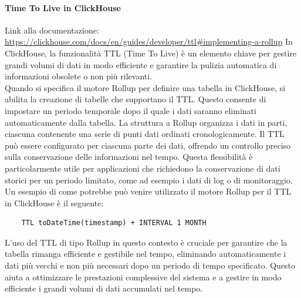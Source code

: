 \paragraph{Time To Live in ClickHouse} \label{sec:RollupTTL}
Link alla documentazione: \href{https://clickhouse.com/docs/en/guides/developer/ttl#implementing-a-rollup}{https://clickhouse.com/docs/en/guides/developer/ttl\#implementing-a-rollup} \newline
In ClickHouse, la funzionalità TTL (Time To Live) è un elemento chiave per gestire grandi volumi di dati in modo efficiente e garantire la pulizia automatica di informazioni obsolete o non più rilevanti. \\
Quando si specifica il motore Rollup per definire una tabella in ClickHouse, si abilita la creazione di tabelle che supportano il TTL. Questo consente di impostare un periodo temporale dopo il quale i dati saranno eliminati automaticamente dalla tabella. La struttura a Rollup organizza i dati in parti, ciascuna contenente una serie di punti dati ordinati cronologicamente. Il TTL può essere configurato per ciascuna parte dei dati, offrendo un controllo preciso sulla conservazione delle informazioni nel tempo. Questa flessibilità è particolarmente utile per applicazioni che richiedono la conservazione di dati storici per un periodo limitato, come ad esempio i dati di log o di monitoraggio. \newline
Un esempio di come potrebbe può venire utilizzato il motore Rollup per il TTL in ClickHouse è il seguente:
\begin{verbatim}
    TTL toDateTime(timestamp) + INTERVAL 1 MONTH
\end{verbatim}
L'uso del TTL di tipo Rollup in questo contesto è cruciale per garantire che la tabella rimanga efficiente e gestibile nel tempo, eliminando automaticamente i dati più vecchi e non più necessari dopo un periodo di tempo specificato. Questo aiuta a ottimizzare le prestazioni complessive del sistema e a gestire in modo efficiente i grandi volumi di dati accumulati nel tempo.


